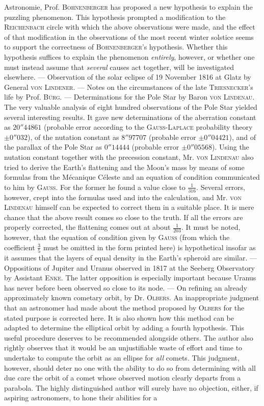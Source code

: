 Astronomie, Prof. \textsc{Bohnenberger} has proposed a new hypothesis to explain the puzzling phenomenon. This hypothesis prompted a modification to the \textsc{Reichenbach} circle with which the above observations were made, and the effect of that modification in the observations of the most recent winter solstice seems to support the correctness of \textsc{Bohnenberger}'s hypothesis. Whether this hypothesis suffices to explain the phenomenon \emph{entirely}, however, or whether one must instead assume that \emph{several} causes act together, will be investigated elsewhere. --- Observation of the solar eclipse of 19 November 1816 at Glatz by General \textsc{von Lindener}. --- Notes on the circumstances of the late \textsc{Triesnecker}'s life by Prof. \textsc{Bürg}. --- Determinations for the Pole Star by Baron \textsc{von Lindenau}. The very valuable analysis of eight hundred observations of the Pole Star yielded several interesting results. It gave new determinations of the aberration constant as $20''44861$ (probable error according to the \textsc{Gauss-Laplace} probability theory $\pm0''032$), of the nutation constant as $8''97707$ (probable error $\pm0''04421$), and of the parallax of the Pole Star as $0''14444$ (probable error $\pm0''05568$). Using the nutation constant together with the precession constant, Mr. \textsc{von Lindenau} also tried to derive the Earth's flattening and the Moon's mass by means of some formulas from the Mécanique Céleste and an equation of condition communicated to him by \textsc{Gauss}. For the former he found a value close to $\tfrac{1}{316}$. Several errors, however, crept into the formulas used and into the calculation, and Mr. \textsc{von Lindenau} himself can be expected to correct them in a suitable place. It is mere chance that the above result comes so close to the truth. If all the errors are properly corrected, the flattening comes out at about $\tfrac{1}{203}$. It must be noted, however, that the equation of condition given by \textsc{Gauss} (from which the coefficient $\tfrac{3}{5}$ must be omitted in the form printed here) is hypothetical insofar as it assumes that the layers of equal density in the Earth's spheroid are similar. --- Oppositions of Jupiter and Uranus observed in 1817 at the Seeberg Observatory by Assistant \textsc{Enke}. The latter opposition is especially important because Uranus has never before been observed so close to its node. --- On refining an already approximately known cometary orbit, by Dr. \textsc{Olbers}. An inappropriate judgment that an astronomer had made about the method proposed by \textsc{Olbers} for the stated purpose is corrected here. It is also shown how this method can be adapted to determine the elliptical orbit by adding a fourth hypothesis. This useful procedure deserves to be recommended alongside others. The author also rightly observes that it would be an unjustifiable waste of effort and time to undertake to compute the orbit as an ellipse for \emph{all} comets. This judgment, however, should deter no one with the ability to do so from determining with all due care the orbit of a comet whose observed motion clearly departs from a parabola. The highly distinguished author will surely have no objection, either, if aspiring astronomers, to hone their abilities for a 